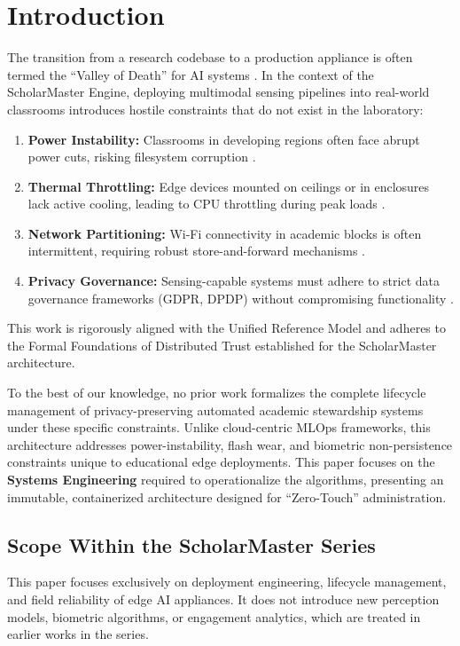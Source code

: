 \documentclass[conference]{IEEEtran}
\begin{document}
\section{Introduction}
The transition from a research codebase to a production appliance is often termed the ``Valley of Death'' for AI systems \cite{b11}. In the context of the ScholarMaster Engine, deploying multimodal sensing pipelines into real-world classrooms introduces hostile constraints that do not exist in the laboratory:
\begin{enumerate}
    \item \textbf{Power Instability:} Classrooms in developing regions often face abrupt power cuts, risking filesystem corruption \cite{b25}.
    \item \textbf{Thermal Throttling:} Edge devices mounted on ceilings or in enclosures lack active cooling, leading to CPU throttling during peak loads \cite{b12}.
    \item \textbf{Network Partitioning:} Wi-Fi connectivity in academic blocks is often intermittent, requiring robust store-and-forward mechanisms \cite{b16}.
    \item \textbf{Privacy Governance:} Sensing-capable systems must adhere to strict data governance frameworks (GDPR, DPDP) without compromising functionality \cite{b9}.
\end{enumerate} This work is rigorously aligned with the Unified Reference Model \cite{P20} and adheres to the Formal Foundations of Distributed Trust \cite{P21} established for the ScholarMaster architecture.

To the best of our knowledge, no prior work formalizes the complete lifecycle management of privacy-preserving automated academic stewardship systems under these specific constraints. Unlike cloud-centric MLOps frameworks, this architecture addresses power-instability, flash wear, and biometric non-persistence constraints unique to educational edge deployments. This paper focuses on the \textbf{Systems Engineering} required to operationalize the algorithms, presenting an immutable, containerized architecture designed for ``Zero-Touch'' administration.

\subsection{Scope Within the ScholarMaster Series}
This paper focuses exclusively on deployment engineering, lifecycle management, and field reliability of edge AI appliances. It does not introduce new perception models, biometric algorithms, or engagement analytics, which are treated in earlier works in the series.
\end{document}
